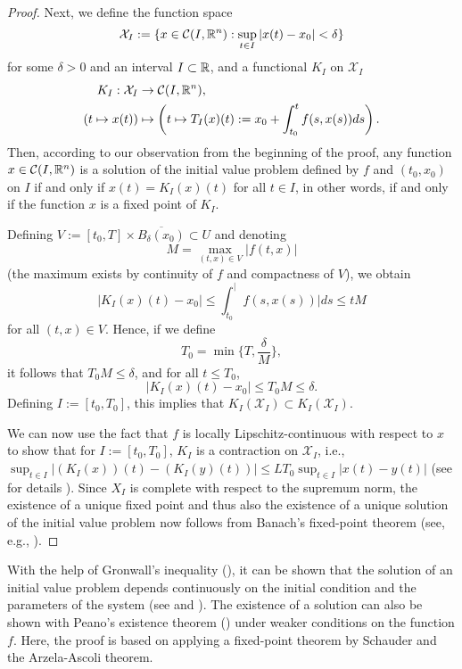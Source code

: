 \begin{theorem}
\begin{proof}
		Next, we define the function space 
		$$ \mathcal{X}_I := \lbrace x\in \mathcal{C}(I,\mathbb{R}^n): \sup_{t\in I} \vert x(t) - x_0\vert <\delta\rbrace $$ 
		for some $\delta > 0$ and an interval $I\subset \mathbb{R}$, and a functional $K_I$ on $\mathcal{X}_I$ 
		\begin{equation*}
			\begin{split}
					K_I: \mathcal{X}_I &\to \mathcal{C}(I,\mathbb{R}^n), \\
					(t\mapsto x(t)) &\mapsto \left( t\mapsto T_I(x)(t) := x_0 + \int_{t_0}^{t}f(s,x(s)) ds\right).
			\end{split}
		\end{equation*}
		Then, according to our observation from the beginning of the proof, any function $x\in\mathcal{C}(I,\mathbb{R}^n)$ is a solution of the initial value problem defined by $f$ and $(t_0,x_0)$ on $I$ if and only if $x(t) = K_I(x)(t)$ for all $t\in I$, in other words, if and only if the function $x$ is a fixed point of $K_I$. 
		
		Defining $V := [t_0,T] \times \overline{B_{\delta}(x_0)} \subset U$ and denoting 
		$$M = \max_{(t,x)\in V} \vert f(t,x)\vert$$ 
		(the maximum exists by continuity of $f$ and compactness of $V$), we obtain 
		$$ \vert K_I(x)(t) - x_0 \vert \leq \int_{t_0}^ \vert f(s,x(s))\vert ds \leq tM$$
		for all $(t,x) \in V$. 
		Hence, if we define $$T_0 = \min \lbrace T,\frac{\delta}{M}\rbrace,$$ it follows that $T_0M\leq \delta$, and for all $t\leq T_0$, 
		$$ \vert K_I(x)(t) - x_0 \vert \leq T_0 M \leq \delta.$$
		Defining $I := [t_0, T_0]$, this implies that $K_I(\mathcal{X}_I) \subset K_I(\mathcal{X}_I)$. 
				
		We can now use the fact that $f$ is locally Lipschitz-continuous with respect to $x$ to show that for $I := [t_0, T_0]$, $K_I$ is a contraction on $\mathcal{X}_I$, i.e., $\sup_{t\in I}\vert (K_I(x))(t) - (K_I(y)(t))\vert \leq L T_0\sup_{t\in I}\vert x(t) - y(t)\vert$ (see for details \cite[pp.~40f.]{Teschl2012}). Since $X_I$ is complete with respect to the supremum norm, the existence of a unique fixed point and thus also the existence of a unique solution of the initial value problem now follows from Banach's fixed-point theorem (see, e.g., \cite[Theorem~2.1, p.~35]{Teschl2012}). 
	\end{proof}
\end{theorem}

\begin{rmk}
	With the help of Gronwall's inequality (\cite[p.~42f.]{Teschl2012}), it can be shown that the solution of an initial value problem depends continuously on the initial condition and the parameters of the system (see \cite[Section~2.3, pp.~79-84]{Perko2001} and \cite[Section~2.4, pp.~41-48]{Teschl2012}). 
	The existence of a solution can also be shown with Peano's existence theorem (\cite[Theorem~2.19, pp.~56f.]{Teschl2012}) under weaker conditions on the function $f$. Here, the proof is based on applying a fixed-point theorem by Schauder and the Arzela-Ascoli theorem.
\end{rmk}

